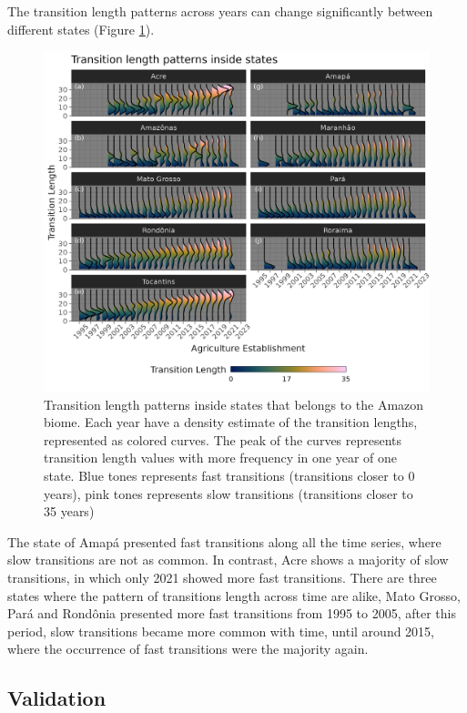 \documentclass[essd, manuscript]{copernicus}
\begin{document}
The transition length patterns across years can change significantly between different states (Figure \ref{fig:transridge-plot}).

\begin{figure}[ht]
\includegraphics[width=17cm]{figs/trans_ridge} \caption{Transition length patterns inside states that belongs to the Amazon biome. Each year have a density estimate of the transition lengths, represented as colored curves. The peak of the curves represents transition length values with more frequency in one year of one state. Blue tones represents fast transitions (transitions closer to 0 years), pink tones represents slow transitions (transitions closer to 35 years)}\label{fig:transridge-plot}
\end{figure}

The state of Amapá presented fast transitions along all the time series, where slow transitions are not as common.
In contrast, Acre shows a majority of slow transitions, in which only 2021 showed more fast transitions.
There are three states where the pattern of transitions length across time are alike, Mato Grosso, Pará and Rondônia presented more fast transitions from 1995 to 2005, after this period, slow transitions became more common with time, until around 2015, where the occurrence of fast transitions were the majority again.

\subsection{Validation}
\end{document}
